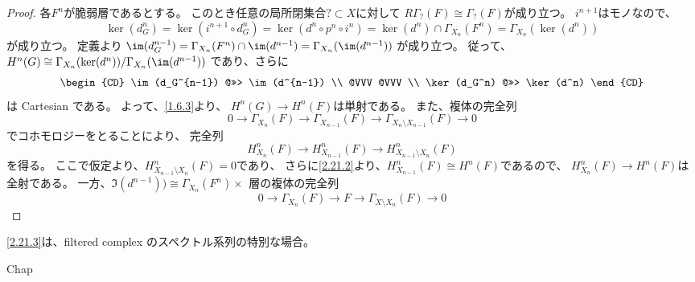 \documentclass[uplatex,dvipdfmx]{jsarticle}
\begin{document}
\begin{proof}
  各\(F^n\)が脆弱層であるとする。
  このとき任意の局所閉集合\(?\subset X\)に対して
  \(R\Gamma_{?}(F)\cong \Gamma_{?}(F)\)が成り立つ。
  \(i^{n+1}\)はモノなので、
  \[
  \ker(d_G^n) = \ker(i^{n+1}\circ d_G^n) = \ker(d^n\circ p^n \circ i^n)
  = \ker(d^n)\cap \Gamma_{X_n}(F^n) = \Gamma_{X_n}(\ker(d^n))
  \]
  が成り立つ。
  定義より
  \(\im(d_G^{n-1}) = \Gamma_{X_n}(F^n)\cap \im(d^{n-1}) = \Gamma_{X_n}(\im(d^{n-1}))\)
  が成り立つ。
  従って、
  \(H^n(G) \cong \Gamma_{X_n}(\ker(d^n))/\Gamma_{X_n}(\im(d^{n-1}))\)
  であり、さらに
  \[
  \begin{CD}
    \im(d_G^{n-1}) @>>> \im(d^{n-1}) \\
    @VVV @VVV \\
    \ker(d_G^n) @>>> \ker(d^n)
  \end{CD}
  \]
  は Cartesian である。
  よって、\autoref{1.6.3}より、
  \(H^n(G) \to H^n(F)\)は単射である。
  また、複体の完全列
  \[
  0\to \Gamma_{X_n}(F) \to \Gamma_{X_{n-1}}(F) \to
  \Gamma_{X_n\setminus X_{n-1}}(F) \to 0
  \]
  でコホモロジーをとることにより、
  完全列
  \[
  H^n_{X_n}(F) \to H^n_{X_{n-1}}(F) \to H^n_{X_{n-1}\setminus X_n}(F)
  \]
  を得る。
  ここで仮定より、\(H^n_{X_{n-1}\setminus X_n}(F) = 0\)であり、
  さらに\ref{2.21.2}より、\(H^n_{X_{n-1}}(F)\cong H^n(F)\)であるので、
  \(H^n_{X_n}(F) \to H^n(F)\)は全射である。
  一方、\(\Im(d^{n-1})) \cong \Gamma_{X_n}(F^n)\times_{} \)
  層の複体の完全列
  \[
  0 \to \Gamma_{X_n}(F) \to F\to \Gamma_{X\setminus X_n}(F) \to 0
  \]

\end{proof}

\begin{kansou*}
  \ref{2.21.3}は、filtered complex のスペクトル系列の特別な場合。
\end{kansou*}


\ifcsname Chap\endcsname\else
\printbibliography
\end{document}
